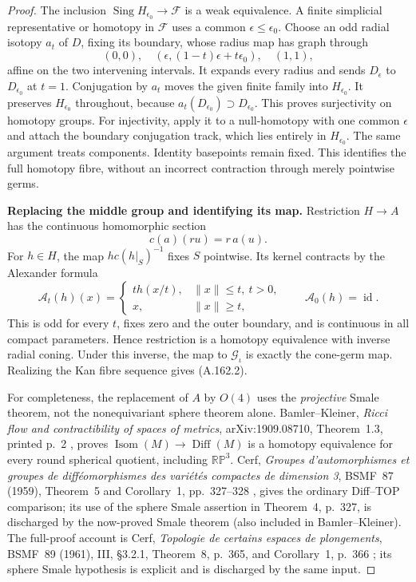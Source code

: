 \begin{proof}
The inclusion $\operatorname{Sing}H_{\epsilon_0}\to\mathcal F$ is a
weak equivalence. A finite simplicial representative or homotopy in
$\mathcal F$ uses a common $\epsilon\le\epsilon_0$. Choose an odd radial
isotopy $a_t$ of $D$, fixing its boundary, whose radius map has graph
through
\[
 (0,0),\quad
 (\epsilon,(1-t)\epsilon+t\epsilon_0),\quad(1,1),
\]
affine on the two intervening intervals. It expands every radius and
sends $D_\epsilon$ to $D_{\epsilon_0}$ at $t=1$.
Conjugation by $a_t$ moves the given finite family into
$H_{\epsilon_0}$. It preserves $H_{\epsilon_0}$ throughout, because
$a_t(D_{\epsilon_0})\supset D_{\epsilon_0}$. This proves surjectivity on
homotopy groups. For injectivity, apply it to a null-homotopy with one
common $\epsilon$ and attach the boundary conjugation track, which lies
entirely in $H_{\epsilon_0}$. The same argument treats components.
Identity basepoints remain fixed. This identifies the full homotopy
fibre, without an incorrect contraction through merely pointwise germs.

\textbf{Replacing the middle group and identifying its map.}\quad
Restriction $H\to A$ has the continuous homomorphic section
\[
 c(a)(ru)=r\,a(u).
\]
For $h\in H$, the map $h c(h|_S)^{-1}$ fixes $S$ pointwise. Its kernel
contracts by the Alexander formula
\[
 \mathcal A_t(h)(x)=
 \begin{cases}t h(x/t),&\|x\|\le t,\ t>0,\\
 x,&\|x\|\ge t,
 \end{cases}
 \qquad \mathcal A_0(h)=\operatorname{id}.
\]
This is odd for every $t$, fixes zero and the outer boundary, and is
continuous in all compact parameters. Hence restriction is a homotopy
equivalence with inverse radial coning. Under this inverse, the map to
$\mathcal G_\iota$ is exactly the cone-germ map. Realizing the Kan fibre
sequence gives (A.162.2).

For completeness, the replacement of $A$ by $O(4)$ uses the
\emph{projective} Smale theorem, not the nonequivariant sphere theorem
alone. Bamler--Kleiner, \emph{Ricci flow and contractibility of spaces of
metrics}, arXiv:1909.08710, Theorem~1.3, printed p.~2
\cite{BamlerKleiner2019Metrics}, proves
$\operatorname{Isom}(M)\to\operatorname{Diff}(M)$ is a homotopy equivalence
for every round spherical quotient, including $\mathbb {RP}^3$.
Cerf, \emph{Groupes d'automorphismes et groupes de diff\'eomorphismes des
vari\'et\'es compactes de dimension 3}, BSMF~87 (1959), Theorem~5 and
Corollary~1, pp.~327--328 \cite{Cerf1959}, gives the ordinary Diff--TOP comparison;
its use of the sphere Smale assertion in Theorem~4, p.~327, is discharged
by the now-proved Smale theorem (also included in Bamler--Kleiner).
The full-proof account is Cerf, \emph{Topologie de certains espaces de
plongements}, BSMF~89 (1961), III, \S3.2.1, Theorem~8, p.~365, and
Corollary~1, p.~366 \cite{Cerf1961}; its sphere Smale hypothesis is
explicit and is discharged by the same input.


\end{proof}
